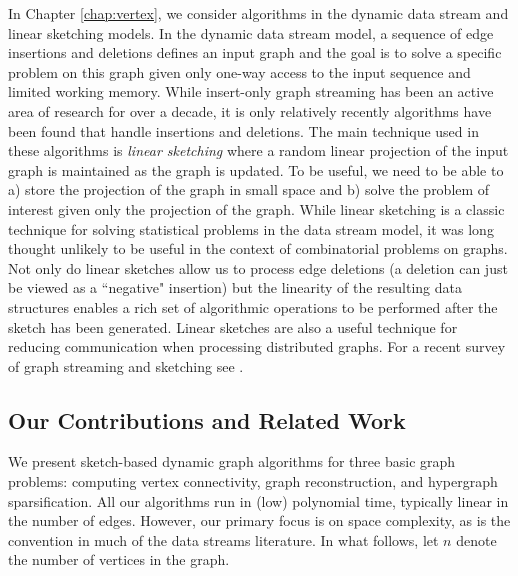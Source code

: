 In Chapter \ref{chap:vertex}, we consider algorithms in the dynamic data stream and linear sketching models. In the dynamic data stream model, a sequence of edge insertions and deletions defines an input graph and the goal is to solve a specific problem on this graph given only one-way access to the input sequence and limited working memory. While insert-only graph streaming has been an active area of research for over a decade, it is only relatively recently algorithms have been found that handle insertions and deletions\cite{AhnGM12a,AhnGM12b,AhnGM13,KapralovLMMS14,KapralovW14,GoelKP12,KutzkovP14a}. The main technique used in these algorithms is \emph{linear sketching} where a random linear projection of the input graph is maintained as the graph is updated. To be useful, we need to be able to a) store the projection of the graph in small space and b) solve the problem of interest given only the projection of the graph. While linear sketching is a classic technique for solving statistical problems in the data stream model, it was long thought unlikely to be useful in the context of combinatorial problems on graphs. Not only do linear sketches allow us to process edge deletions (a deletion can just be viewed as a ``negative" insertion) but the linearity of the resulting data structures enables a rich set of algorithmic operations to be performed after the sketch has been generated. Linear sketches are also a useful technique for reducing communication when processing distributed graphs. For a recent survey of graph streaming and sketching  see  \cite{McGregor14}.

\subsection{Our Contributions and Related Work}
We present sketch-based dynamic graph algorithms for three basic graph problems: computing vertex connectivity, graph reconstruction, and hypergraph sparsification. All our algorithms run in (low) polynomial time, typically linear in the number of edges. However, our primary focus is on space complexity, as is the convention in much of the data streams literature. In what follows, let $n$ denote the number of vertices in the graph.

